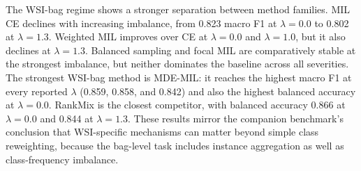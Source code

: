 \documentclass[11pt]{article}
\begin{document}
\begin{table}[ht]
  \centering
  \caption{Patch-feature calibration before and after validation-fitted temperature scaling.}
  \label{tab:patch-calibration}
\end{table}

\begin{table}[ht]
  \centering
  \caption{WSI-bag calibration before and after validation-fitted temperature scaling.}
  \label{tab:wsi-calibration}
\end{table}

The WSI-bag regime shows a stronger separation between method families. MIL CE declines with increasing imbalance, from \num{0.823} macro F1 at $\lambda=0.0$ to \num{0.802} at $\lambda=1.3$. Weighted MIL improves over CE at $\lambda=0.0$ and $\lambda=1.0$, but it also declines at $\lambda=1.3$. Balanced sampling and focal MIL are comparatively stable at the strongest imbalance, but neither dominates the baseline across all severities. The strongest WSI-bag method is MDE-MIL: it reaches the highest macro F1 at every reported $\lambda$ (\num{0.859}, \num{0.858}, and \num{0.842}) and also the highest balanced accuracy at $\lambda=0.0$. RankMix is the closest competitor, with balanced accuracy \num{0.866} at $\lambda=0.0$ and \num{0.844} at $\lambda=1.3$. These results mirror the companion benchmark's conclusion that WSI-specific mechanisms can matter beyond simple class reweighting, because the bag-level task includes instance aggregation as well as class-frequency imbalance.
\end{document}
